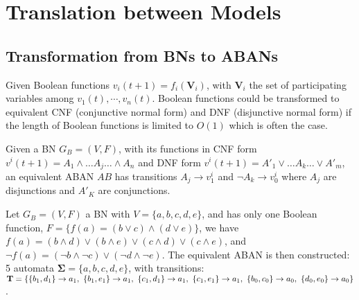 \chapter{Translation between Models}
\section{Transformation from BNs to ABANs}\label{appendix:trans}

Given Boolean functions $v_i(t+1)=f_i(\mathbf{V}_i)$, with $\mathbf{V}_i$ the set of participating variables among $v_1(t),\cdots,v_n(t)$.
Boolean functions could be transformed to equivalent CNF (conjunctive normal form) and DNF (disjunctive normal form) if the length of Boolean functions is limited to $O(1)$ \cite{miltersen2005converting} which is often the case.
\begin{proposition}
Given a BN $G_B=(V,F)$, with its functions in CNF form $v^i(t+1)=A_1\land\ldots A_j \ldots\land A_n$ and DNF form $v^i(t+1)=A'_1\lor\ldots A_k\ldots\lor A'_m$, an equivalent ABAN $AB$ has transitions $A_j\to v^i_1$ and $\lnot A_k\to v^i_0$ where $A_j$ are disjunctions and $A'_K$ are conjunctions.
\end{proposition}
\begin{example}
Let $G_B=(V,F)$ a BN with $V=\{a,b,c,d,e\}$, and has only one Boolean function, $F=\{f(a)= (b\lor c)\land(d\lor e)\}$, we have 
$f(a)=(b\land d)\lor(b\land e)\lor(c\land d)\lor(c\land e)$, and $\lnot f(a)=(\lnot b\land \lnot c)\lor(\lnot d\land \lnot e)$. 
The equivalent ABAN is then constructed: 5 automata $\mathbf{\Sigma}=\{a,b,c,d,e\}$, with transitions: $\mathbf{T}=\{\acm{b_1,d_1}{a_0}{a_1},\ \acm{b_1,e_1}{a_0}{a_1},\ \acm{c_1,d_1}{a_0}{a_1},\ \acm{c_1,e_1}{a_0}{a_1},\ \acm{b_0,c_0}{a_1}{a_0},\ \acm{d_0,e_0}{a_1}{a_0}\}$.
\end{example}
